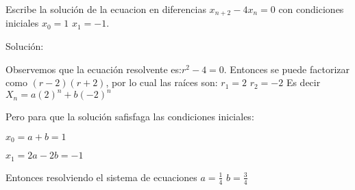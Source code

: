 \documentclass{article}
\begin{document}
Escribe la solución de la ecuacion en diferencias $x_{n+2}-4x_n=0$ con condiciones iniciales $x_0=1$ $x_1=-1$.

Solución:

Observemos que la ecuación resolvente es:$r^2-4=0$. Entonces se puede factorizar como $(r-2)(r+2)$, por lo cual las raíces son: $r_1=2$ $r_2=-2$
Es decir $X_n=a(2)^n+b(-2)^n$

Pero para que la solución safisfaga las condiciones iniciales:

$x_0=a+b=1$

$x_1=2a-2b=-1$

Entonces resolviendo el sistema de ecuaciones $a=\frac{1}{4}$ $b=\frac{3}{4}$
\end{document}
